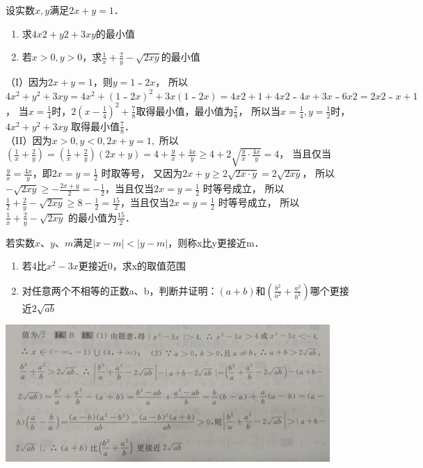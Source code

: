 \par
\begin{problem}
    设实数$x,y$满足$2x+y=1$．
    \begin{enumerate}
        \item 求$4x2+y2+3xy$的最小值
        \item 若$x>0,y>0$，求$\displaystyle \frac{1}{x}+\frac{2}{y}-\sqrt{2xy}$的最小值
    \end{enumerate}
    \begin{jiexi}
        （I）因为$2x+y=1$，则$y=1﹣2x$，
所以$4x^2+y^2+3xy=4x^2+(1﹣2x)^2+3x(1﹣2x)=4x2+1+4x2﹣4x+3x﹣6x2=2x2﹣x+1$，
当$x=\frac{1}{4}$时，$\displaystyle 2(x-\frac{1}{4})^2+\frac{7}{8}$取得最小值，最小值为$\frac{7}{8}$，
所以当$\displaystyle x=\frac{1}{4},y=\frac{1}{2}$时，$4x^2+y^2+3xy$ 取得最小值$\displaystyle \frac{7}{8}$．\\
（II）因为$x>0,y<0,2x+y=1,$
所以$\displaystyle (\frac{1}{x}+\frac{2}{y})=(\frac{1}{x}+\frac{2}{y})(2x+y)=4+\frac{y}{x}+\frac{4x}{y}\ge4+2\sqrt{\frac{y}{x}\cdot\frac{4x}{y}}=4$，
当且仅当 $\displaystyle \frac{y}{x}=\frac{4x}{y}$，即$\displaystyle 2x=y=\frac{1}{2}$ 时取等号，
又因为$2x+y\ge2\sqrt{2x\cdot y}=2\sqrt{2xy}$，
所以$\displaystyle -\sqrt{2xy}\ge -\frac{2x+y}{2}=-\frac{1}{2}$，当且仅当$\displaystyle 2x=y=\frac{1}{2}$ 时等号成立，
所以$\displaystyle \frac{1}{2}+\frac{2}{y}-\sqrt{2xy}\ge8-\frac{1}{2}=\frac{15}{2}$，当且仅当$2x=y=\frac{1}{2}$ 时等号成立，
所以$\displaystyle \frac{1}{x}+\frac{2}{y}-\sqrt{2xy}$ 的最小值为$\displaystyle \frac{15}{2}$．
    \end{jiexi}
\end{problem}

\par
\begin{problem}
    若实数$x、y、m$满足$|x-m|<|y-m|$，则称x比y更接近m．
    \begin{enumerate}
        \item 若4比$x^2-3x$更接近0，求x的取值范围
        \item 对任意两个不相等的正数a、b，判断并证明：$(a+b)$和$\displaystyle (\frac{b^2}{a^2}+\frac{a^2}{b^2})$哪个更接近$2\sqrt{ab}$
    \end{enumerate}
    \begin{jiexi}
        \includegraphics[scale=1.3]{pictures/image2.png}\\
    \end{jiexi}
\end{problem}


